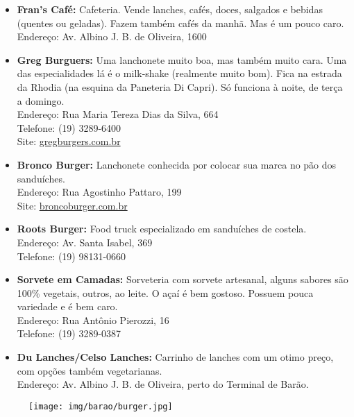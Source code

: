 \begin{itemize}
    \item   \textbf{Fran's Café:} Cafeteria. Vende lanches, cafés, doces,
        salgados e bebidas (quentes ou geladas). Fazem também cafés da manhã.
        Mas é um pouco caro.
        \\Endereço: Av. Albino J. B. de Oliveira, 1600

    \item   \textbf{Greg Burguers:} Uma lanchonete muito boa, mas também muito
        cara.  Uma das especialidades lá é o milk-shake (realmente muito bom).
        Fica na estrada da Rhodia (na esquina da Paneteria Di Capri). Só
        funciona à noite, de terça a domingo.
        \\Endereço: Rua Maria Tereza Dias da Silva, 664
        \\Telefone: (19) 3289-6400
        \\Site: \url{gregburgers.com.br}

    \item    \textbf{Bronco Burger:} Lanchonete conhecida por colocar sua marca
        no pão dos sanduíches.
        \\Endereço: Rua Agostinho Pattaro, 199
        \\Site: \url{broncoburger.com.br}

    \item    \textbf{Roots Burger:} Food truck especializado em sanduíches de
        costela.
        \\Endereço: Av. Santa Isabel, 369
        \\Telefone: (19) 98131-0660

    \item   \textbf{Sorvete em Camadas:}
        Sorveteria com sorvete artesanal, alguns sabores são 100\% vegetais,
        outros, ao leite. O açaí é bem gostoso. Possuem pouca variedade e é bem
        caro.
        \\Endereço: Rua Antônio Pierozzi, 16
        \\Telefone: (19) 3289-0387

    \item    \textbf{Du Lanches/Celso Lanches:} Carrinho de lanches com um otimo
        preço, com opções também vegetarianas.
        \\Endereço: Av. Albino J. B. de Oliveira, perto do Terminal de Barão.

\end{itemize}

\begin{figure}[h!]
    \centering
    \texttt{[image: img/barao/burger.jpg]}
\end{figure}

